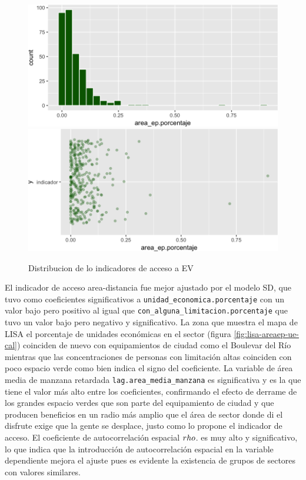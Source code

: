 \documentclass[12pt,]{book}
\begin{document}
\begin{figure}
\includegraphics[width=1\linewidth]{tesis-unigis_files/figure-latex/hist-areaep-1} \includegraphics[width=1\linewidth]{tesis-unigis_files/figure-latex/hist-areaep-2} \caption{Distribucion de lo indicadores de acceso a EV }\label{fig:hist-areaep}
\end{figure}

El indicador de acceso area-distancia fue mejor ajustado por el modelo
SD, que tuvo como coeficientes significativos a
\texttt{unidad\_economica.porcentaje} con un valor bajo pero positivo al
igual que \texttt{con\_alguna\_limitacion.porcentaje} que tuvo un valor
bajo pero negativo y significativo. La zona que muestra el mapa de LISA
el porcentaje de unidades económicas en el sector (figura
\ref{fig:lisa-areaep-ue-cal}) coinciden de nuevo con equipamientos de
ciudad como el Boulevar del Río mientras que las concentraciones de
personas con limitación altas coinciden con poco espacio verde como bien
indica el signo del coeficiente. La variable de área media de manzana
retardada \texttt{lag.area\_media\_manzana} es significativa y es la que
tiene el valor más alto entre los coeficientes, confirmando el efecto de
derrame de los grandes espacio verdes que son parte del equipamiento de
ciudad y que producen beneficios en un radio más amplio que el área de
sector donde di el disfrute exige que la gente se desplace, justo como
lo propone el indicador de acceso. El coeficiente de autocorrelación
espacial \(\\rho\). es muy alto y significativo, lo que indica que la
introducción de autocorrelación espacial en la variable dependiente
mejora el ajuste pues es evidente la existencia de grupos de sectores
con valores similares.
\end{document}
